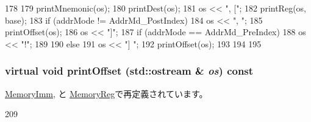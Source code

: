 \begin{DoxyCode}
178 {
179     printMnemonic(os);
180     printDest(os);
181     os << ", [";
182     printReg(os, base);
183     if (addrMode != AddrMd_PostIndex) {
184         os << ", ";
185         printOffset(os);
186         os << "]";
187         if (addrMode == AddrMd_PreIndex) {
188             os << "!";
189         }
190     } else {
191         os << "] ";
192         printOffset(os);
193 
194     }
195 }
\end{DoxyCode}
\hypertarget{classArmISA_1_1Memory_a8ff7c6b5299bfe7b627754684ca9c387}{
\subsubsection[{printOffset}]{\setlength{\rightskip}{0pt plus 5cm}virtual void printOffset (std::ostream \& {\em os}) const}}
\label{classArmISA_1_1Memory_a8ff7c6b5299bfe7b627754684ca9c387}


\hyperlink{classArmISA_1_1MemoryImm_a7fdadf47668a31b2e7b99f0cc36c5d4f}{MemoryImm}, と \hyperlink{classArmISA_1_1MemoryReg_a7fdadf47668a31b2e7b99f0cc36c5d4f}{MemoryReg}で再定義されています。


\begin{DoxyCode}
209     {}
\end{DoxyCode}


